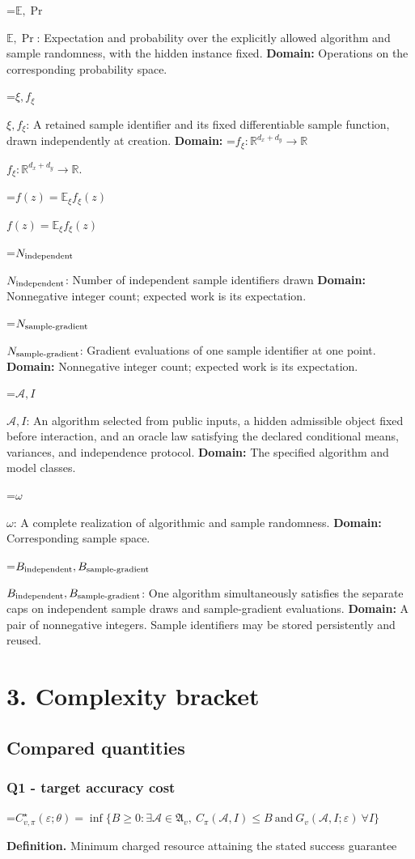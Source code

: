 \documentclass[10pt,a4paper]{article}
\newcommand{\AtlasMath}[1]{\par\begingroup\centering\setbox0=\hbox{$\displaystyle #1$}\ifdim\wd0>1.4\linewidth\typeout{ATLAS WIDE FORMULA: \the\wd0}\fi\ifdim\wd0>\linewidth\resizebox{\linewidth}{!}{\box0}\else\box0\fi\par\endgroup}
\newcommand{\AtlasInlineMath}[1]{\begingroup\setbox0=\hbox{$#1$}\ifdim\wd0>.4\linewidth\endgroup\AtlasMath{#1}\else\endgroup$#1$\fi}
\begin{document}
\AtlasInlineMath{\mathbb E,\Pr}: Expectation and probability over the explicitly allowed algorithm and sample randomness, with the hidden instance fixed. \textbf{Domain:} Operations on the corresponding probability space.

\AtlasInlineMath{\xi,f_\xi}: A retained sample identifier and its fixed differentiable sample function, drawn independently at creation. \textbf{Domain:} \AtlasInlineMath{f_\xi:\mathbb R^{d_x+d_y}\to\mathbb R}.

\AtlasInlineMath{f(z)=\mathbb E_\xi f_\xi(z)}

\AtlasInlineMath{N_{\rm independent}}: Number of independent sample identifiers drawn \textbf{Domain:} Nonnegative integer count; expected work is its expectation.

\AtlasInlineMath{N_{\rm sample\text{-}gradient}}: Gradient evaluations of one sample identifier at one point. \textbf{Domain:} Nonnegative integer count; expected work is its expectation.

\AtlasInlineMath{\mathcal A,I}: An algorithm selected from public inputs, a hidden admissible object fixed before interaction, and an oracle law satisfying the declared conditional means, variances, and independence protocol. \textbf{Domain:} The specified algorithm and model classes.

\AtlasInlineMath{\omega}: A complete realization of algorithmic and sample randomness. \textbf{Domain:} Corresponding sample space.

\AtlasInlineMath{B_{\rm independent},B_{\rm sample\text{-}gradient}}: One algorithm simultaneously satisfies the separate caps on independent sample draws and sample-gradient evaluations. \textbf{Domain:} A pair of nonnegative integers. Sample identifiers may be stored persistently and reused.

\section{3. Complexity bracket}
\subsection{Compared quantities}
\subsubsection{Q1 - target accuracy cost}
\AtlasMath{C^\star_{v,\pi}(\varepsilon;\theta)=\inf\{B\ge0:\exists\mathcal A\in\mathfrak A_v,\ C_\pi(\mathcal A,I)\le B\ \text{and}\ G_v(\mathcal A,I;\varepsilon)\ \forall I\}}
\textbf{Definition.} Minimum charged resource attaining the stated success guarantee
\end{document}
